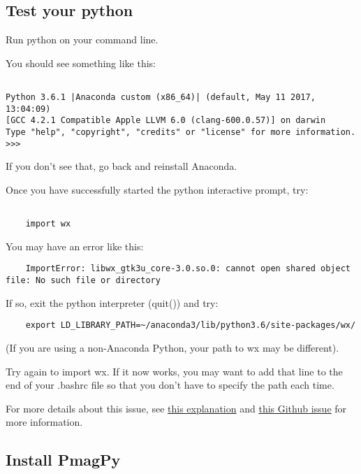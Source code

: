 \documentclass[11pt]{article}
\begin{document}
\subsection{Test your python}


Run python on your command line.

You should see something like this: \begin{verbatim}

Python 3.6.1 |Anaconda custom (x86_64)| (default, May 11 2017, 13:04:09)
[GCC 4.2.1 Compatible Apple LLVM 6.0 (clang-600.0.57)] on darwin
Type "help", "copyright", "credits" or "license" for more information.
>>>\end{verbatim}

If you don't see that, go back and reinstall Anaconda.

Once you have successfully started the python interactive prompt, try:
\begin{verbatim}

    import wx

\end{verbatim}
  You may have an error like this:
\begin{verbatim}
    ImportError: libwx_gtk3u_core-3.0.so.0: cannot open shared object file: No such file or directory

\end{verbatim}

If so, exit the python interpreter (quit()) and try:
  \begin{verbatim}
    export LD_LIBRARY_PATH=~/anaconda3/lib/python3.6/site-packages/wx/

\end{verbatim}

(If you are using a non-Anaconda Python, your path to wx may be different).

Try again to import wx.  If it now works, you may want to add that line to the end of your .bashrc file so that you don't have to specify the path each time.

For more details about this issue, see \href{https://github.com/wxWidgets/Phoenix/blob/e13273c5d939d993abf2a2649e90b3ea0d39382c/packaging/README-bdist.txt#L38-L57}{this explanation} and \href{https://github.com/pyenv/pyenv/issues/691}{this Github issue} for more information.

\subsection{Install PmagPy}
\end{document}
